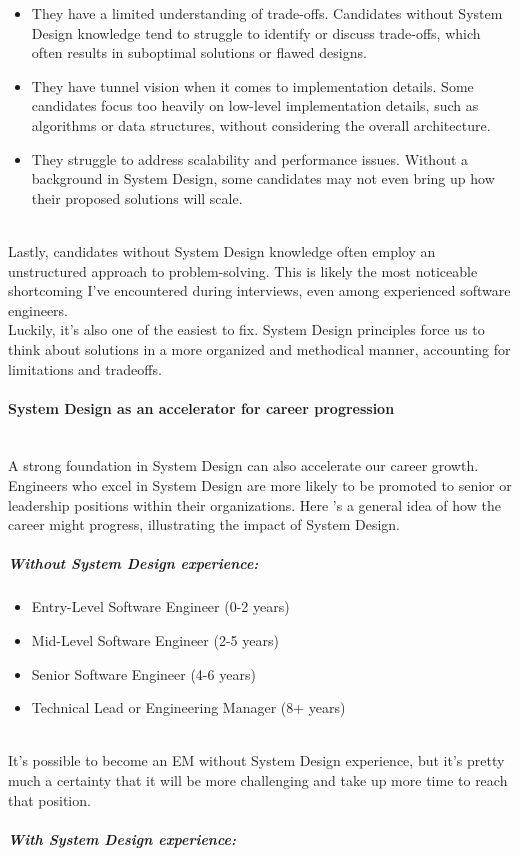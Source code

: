 \begin{itemize}
\item
\protect{}\label{qrUlt2D-hRpo9HxpFjoKz}
They have a limited understanding of trade-offs. Candidates without System Design knowledge tend to struggle to identify or discuss trade-offs, which often results in suboptimal solutions or flawed designs.
\item
\protect{}\label{hE9huIUtL-7pw9zPqHmgo}
They have tunnel vision when it comes to implementation details. Some candidates focus too heavily on low-level implementation details, such as algorithms or data structures, without considering the overall architecture.
\item
\protect{}\label{Te553suhDeftoyTf55rLi}
They struggle to address scalability and performance issues. Without a background in System Design, some candidates may not even bring up how their proposed solutions will scale.
\end{itemize}
\\
Lastly, candidates without System Design knowledge often employ an unstructured approach to problem-solving. This is likely the most noticeable shortcoming I've encountered during interviews, even among experienced software engineers.
\\
Luckily, it's also one of the easiest to fix. System Design principles force us to think about solutions in a more organized and methodical manner, accounting for limitations and tradeoffs.
\\
\paragraph{System Design as an accelerator for career progression}\label{hUWYmnuDF9JNo695E-pdb}
\\
A strong foundation in System Design can also accelerate our career growth. Engineers who excel in System Design are more likely to be promoted to senior or leadership positions within their organizations. Here 's a general idea of how the career might progress, illustrating the impact of System Design.
\\
\subparagraph{Without System Design experience:}\label{IOKNGElABiv2whlxBUpp6}

\begin{itemize}
\item
\protect{}\label{mv9N-WxsOSHC9uChZZwgl}
Entry-Level Software Engineer (0-2 years)
\item
\protect{}\label{WSHlIVhnoFAhkA_X1SlDy}
Mid-Level Software Engineer (2-5 years)
\item
\protect{}\label{Y8V7gAOK5PR3HnoZQPFGX}
Senior Software Engineer (4-6 years)
\item
\protect{}\label{dJa_8ns2JuKn3ngUL6BUp}
Technical Lead or Engineering Manager (8+ years)
\end{itemize}
\\
It's possible to become an EM without System Design experience, but it's pretty much a certainty that it will be more challenging and take up more time to reach that position.
\\
\subparagraph{With System Design experience:}\label{PhHRoU9tICz5VLdgjUogG}

